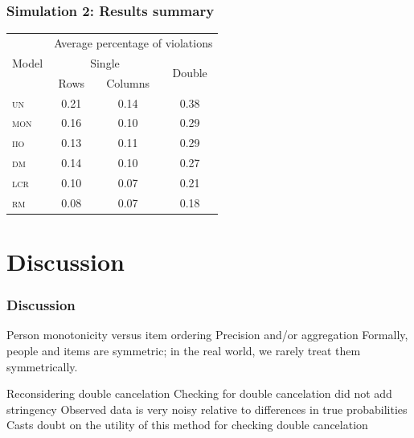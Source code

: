 \documentclass[10pt,serif,professionalfont]{beamer}
\begin{document}
\begin{frame}
    \frametitle{Simulation 2: Results summary}

    \begin{center}
    \begin{tabular}{lccc}
    \toprule
     \multirow{3}{*}{Model} & \multicolumn{3}{c}{Average percentage of violations} \\ \cmidrule(lr){2-4}
                & \multicolumn{2}{c}{Single} & \multirow{2}{*}{Double} \\ \cmidrule(lr){2-3}
                  & Rows       & Columns    &            \\

    \midrule
     \textsc{un}  & 0.21 & 0.14 & 0.38 \\
     \textsc{mon} & 0.16 & 0.10 & 0.29 \\
     \textsc{iio} & 0.13 & 0.11 & 0.29 \\
     \textsc{dm}  & 0.14 & 0.10 & 0.27 \\
     \textsc{lcr} & 0.10 & 0.07 & 0.21 \\
     \textsc{rm}  & 0.08 & 0.07 & 0.18 \\
    \bottomrule
    \end{tabular}
    \end{center}


\end{frame}

\section{Discussion}

\begin{frame}
    \frametitle{Discussion}

    \begin{outline}
        \1 Person monotonicity versus item ordering
            \2 Precision and/or aggregation 
            \2 Formally, people and items are symmetric; in the real world, we rarely treat them symmetrically.  

        \vspace{0.25cm}

        \1 Reconsidering double cancelation
            \2 Checking for double cancelation did not add stringency
            \2 Observed data is very noisy relative to differences in true probabilities
            \2 Casts doubt on the utility of this method for checking double cancelation

    \end{outline}

\end{frame}
\end{document}
